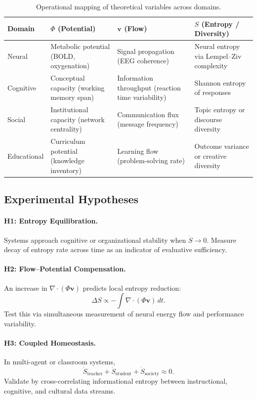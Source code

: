 \documentclass[12pt,a4paper]{article}
\begin{document}
\begin{table}[h!]
\centering
\begin{tabular}{llll}
\toprule
\textbf{Domain} & $\Phi$ (Potential) & $\mathbf{v}$ (Flow) & $S$ (Entropy / Diversity)\\
\midrule
Neural & Metabolic potential (BOLD, oxygenation) & Signal propagation (EEG coherence) & Neural entropy via Lempel–Ziv complexity\\
Cognitive & Conceptual capacity (working memory span) & Information throughput (reaction time variability) & Shannon entropy of responses\\
Social & Institutional capacity (network centrality) & Communication flux (message frequency) & Topic entropy or discourse diversity\\
Educational & Curriculum potential (knowledge inventory) & Learning flow (problem-solving rate) & Outcome variance or creative diversity\\
\bottomrule
\end{tabular}
\caption{Operational mapping of theoretical variables across domains.}
\end{table}

\subsection{Experimental Hypotheses}

\paragraph{H1: Entropy Equilibration.}
Systems approach cognitive or organizational stability when 
$\dot S \!\to\! 0$.  
Measure decay of entropy rate across time as an indicator of evaluative sufficiency.

\paragraph{H2: Flow–Potential Compensation.}
An increase in $\nabla\!\cdot(\Phi\mathbf{v})$ predicts local entropy reduction:
\[
\Delta S \propto -\int \nabla\!\cdot(\Phi\mathbf{v})\,dt.
\]
Test this via simultaneous measurement of neural energy flow and performance variability.

\paragraph{H3: Coupled Homeostasis.}
In multi-agent or classroom systems,
\[
\dot S_{\text{teacher}}+\dot S_{\text{student}}+\dot S_{\mathrm{society}}\approx0.
\]
Validate by cross-correlating informational entropy between instructional, cognitive, and cultural data streams.
\end{document}
